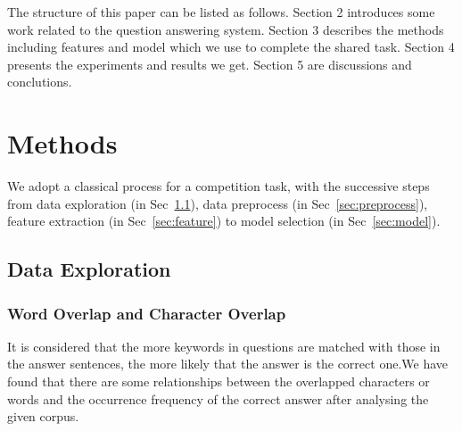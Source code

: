\documentclass{llncs}
\begin{document}
The structure of this paper can be listed as follows. Section 2 introduces some work related to the question answering system. Section 3 describes the methods including features and model which we use to complete the shared task. Section 4  presents the experiments and results we get. Section 5 are discussions and conclutions.


\section{Methods}

We adopt a classical process for a competition task, with the successive steps from data exploration (in Sec~\ref{sec:exploration}), data preprocess (in Sec~\ref{sec:preprocess}), feature extraction (in Sec~\ref{sec:feature}) to model selection (in Sec~\ref{sec:model}).

\subsection{Data Exploration}
\label{sec:exploration}
\subsubsection{Word Overlap and Character Overlap}
It is considered that the more keywords in questions are matched with those in the answer sentences, the more likely that the answer is the correct one.We have found that there are some relationships between the overlapped characters or words and the occurrence frequency of the correct answer after analysing the given corpus.

\end{document}
